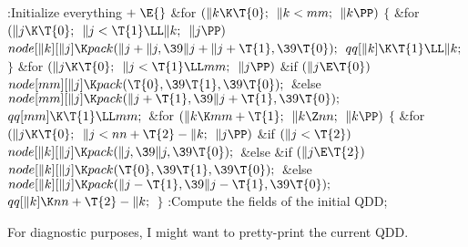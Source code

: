 \Y\B\4:Initialize everything\X${}\mathrel+\E{}$\6
\&{for} ${}(\|k\K\T{0};{}$ ${}\|k<\\{mm};{}$ ${}\|k\PP){}$\5
${}\{{}$\1\6
\&{for} ${}(\|j\K\T{0};{}$ ${}\|j<\T{1}\LL\|k;{}$ ${}\|j\PP){}$\1\5
${}\\{node}[\|k][\|j]\K\\{pack}(\|j+\|j,\39\|j+\|j+\T{1},\39\T{0});{}$\2\6
${}\\{qq}[\|k]\K\T{1}\LL\|k;{}$\6
\4${}\}{}$\2\6
\&{for} ${}(\|j\K\T{0};{}$ ${}\|j<\T{1}\LL\\{mm};{}$ ${}\|j\PP){}$\1\6
\&{if} ${}(\|j\E\T{0}){}$\1\5
${}\\{node}[\\{mm}][\|j]\K\\{pack}(\T{0},\39\T{1},\39\T{0});{}$\2\6
\&{else}\1\5
${}\\{node}[\\{mm}][\|j]\K\\{pack}(\|j+\T{1},\39\|j+\T{1},\39\T{0});{}$\2\2\6
${}\\{qq}[\\{mm}]\K\T{1}\LL\\{mm};{}$\6
\&{for} ${}(\|k\K\\{mm}+\T{1};{}$ ${}\|k\Z\\{nn};{}$ ${}\|k\PP){}$\5
${}\{{}$\1\6
\&{for} ${}(\|j\K\T{0};{}$ ${}\|j<\\{nn}+\T{2}-\|k;{}$ ${}\|j\PP){}$\1\6
\&{if} ${}(\|j<\T{2}){}$\1\5
${}\\{node}[\|k][\|j]\K\\{pack}(\|j,\39\|j,\39\T{0});{}$\2\6
\&{else} \&{if} ${}(\|j\E\T{2}){}$\1\5
${}\\{node}[\|k][\|j]\K\\{pack}(\T{0},\39\T{1},\39\T{0});{}$\2\6
\&{else}\1\5
${}\\{node}[\|k][\|j]\K\\{pack}(\|j-\T{1},\39\|j-\T{1},\39\T{0});{}$\2\2\6
${}\\{qq}[\|k]\K\\{nn}+\T{2}-\|k;{}$\6
\4${}\}{}$\2\6
:Compute the  fields of the initial QDD\X;\par
\fi

For diagnostic purposes, I might want to pretty-print the
current QDD.

